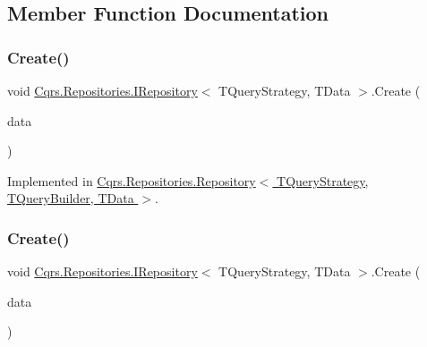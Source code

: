 \subsection{Member Function Documentation}
\mbox{\label{interfaceCqrs_1_1Repositories_1_1IRepository_a240c8d094207a22b0c805a5c830d8615}} 
\subsubsection{\texorpdfstring{Create()}{Create()}\hspace{0.1cm}{\footnotesize\ttfamily [1/2]}}
{\footnotesize\ttfamily void \hyperlink{interfaceCqrs_1_1Repositories_1_1IRepository}{Cqrs.\+Repositories.\+I\+Repository}$<$ T\+Query\+Strategy, T\+Data $>$.Create (\begin{DoxyParamCaption}\item[{T\+Data}]{data }\end{DoxyParamCaption})}



Implemented in \hyperlink{classCqrs_1_1Repositories_1_1Repository_a5d5d78262533aa2ab32eddbab83869bd}{Cqrs.\+Repositories.\+Repository$<$ T\+Query\+Strategy, T\+Query\+Builder, T\+Data $>$}.

\mbox{\label{interfaceCqrs_1_1Repositories_1_1IRepository_ae3481fb2ecb0146308e07a9dd6af8c14}} 
\subsubsection{\texorpdfstring{Create()}{Create()}\hspace{0.1cm}{\footnotesize\ttfamily [2/2]}}
{\footnotesize\ttfamily void \hyperlink{interfaceCqrs_1_1Repositories_1_1IRepository}{Cqrs.\+Repositories.\+I\+Repository}$<$ T\+Query\+Strategy, T\+Data $>$.Create (\begin{DoxyParamCaption}\item[{I\+Enumerable$<$ T\+Data $>$}]{data }\end{DoxyParamCaption})}



